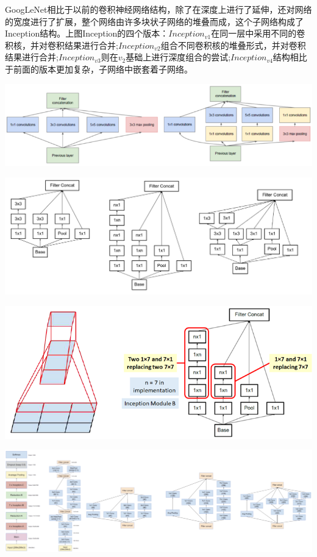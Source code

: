 \documentclass[12pt,a4paper,UTF8,twoside]{book}
\begin{document}
\hspace{0pt}GoogLeNet相比于以前的卷积神经网络结构，除了在深度上进行了延伸，还对网络的宽度进行了扩展，整个网络由许多块状子网络的堆叠而成，这个子网络构成了Inception结构。上图Inception的四个版本：\(Inception_{v1}\)在同一层中采用不同的卷积核，并对卷积结果进行合并;\(Inception_{v2}\)组合不同卷积核的堆叠形式，并对卷积结果进行合并;\(Inception_{v3}\)则在\(v_2\)基础上进行深度组合的尝试;\(Inception_{v4}​\)结构相比于前面的版本更加复杂，子网络中嵌套着子网络。

\begin{center}\includegraphics[width=0.7\linewidth]{img/02-11} \end{center}

\begin{center}\includegraphics[width=0.7\linewidth]{img/02-14} \end{center}

\begin{center}\includegraphics[width=0.7\linewidth]{img/02-12} \end{center}

\begin{center}\includegraphics[width=0.7\linewidth]{img/02-13} \end{center}
\end{document}
